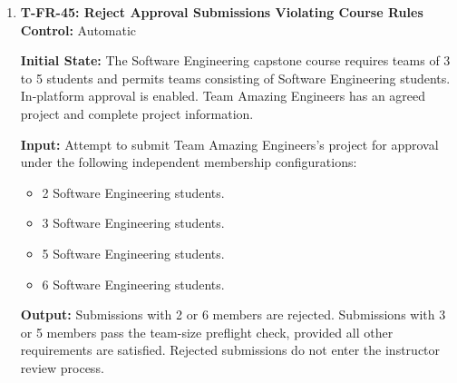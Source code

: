 \documentclass[12pt, titlepage]{article}
\begin{document}
\begin{enumerate}
\textbf{Input:} Repeat the approval submission test while omitting one required project or team information field at a time.

\textbf{Output:} Each incomplete submission is rejected with a validation message identifying the missing information. The application remains in its previous status, and no submission is forwarded for instructor review.

\textbf{Test Case Derivation:} Derived from \texttt{FR\_ApprovalPreflightValidate}, which requires submissions to contain complete project information. For the set of required fields, a submission is complete only when all fields are valid. Omitting any required field violates this condition and must prevent submission.

\textbf{How Test Will Be Performed:} Prepare an otherwise valid agreed team-project. Using Playwright, remove each required field individually and attempt submission. Verify that the corresponding validation message appears, no approval submission is created, and the original application status remains unchanged.

\item \label{T-FR-45}\textbf{T-FR-45: Reject Approval Submissions Violating Course Rules}\\

\textbf{Control:} Automatic

\textbf{Initial State:} The Software Engineering capstone course requires teams of 3 to 5 students and permits teams consisting of Software Engineering students. In-platform approval is enabled. Team Amazing Engineers has an agreed project and complete project information.

\textbf{Input:} Attempt to submit Team Amazing Engineers's project for approval under the following independent membership configurations:
\begin{itemize}
    \item 2 Software Engineering students.
    \item 3 Software Engineering students.
    \item 5 Software Engineering students.
    \item 6 Software Engineering students.
\end{itemize}

\textbf{Output:} Submissions with 2 or 6 members are rejected. Submissions with 3 or 5 members pass the team-size preflight check, provided all other requirements are satisfied. Rejected submissions do not enter the instructor review process.


\end{enumerate}
\end{document}
